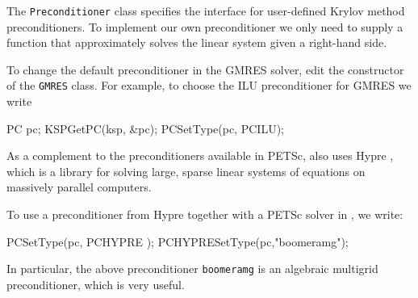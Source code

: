 The \texttt{Preconditioner} class specifies the interface for user-defined 
Krylov method preconditioners. To implement our own preconditioner we only 
need to supply a function that approximately solves the linear system given 
a right-hand side.

To change the default preconditioner in the \dolfin{} GMRES solver, edit the 
constructor of the \texttt{GMRES} class. For example, to choose the 
ILU preconditioner for GMRES we write 
%
\begin{code}
PC pc;
KSPGetPC(ksp, &pc);
PCSetType(pc, PCILU);
\end{code}

As a complement to the preconditioners available in PETSc, 
\dolfin{} also uses Hypre \cite{www:hypre}, which is a 
library for solving large, sparse linear systems of equations on 
massively parallel computers. 

To use a preconditioner from Hypre together with a PETSc solver in \dolfin{}, we write:  
%
\begin{code}
PCSetType(pc, PCHYPRE );
PCHYPRESetType(pc,"boomeramg");
\end{code}

In particular, the above preconditioner \texttt{boomeramg} is an algebraic multigrid 
preconditioner, which is very useful. 

